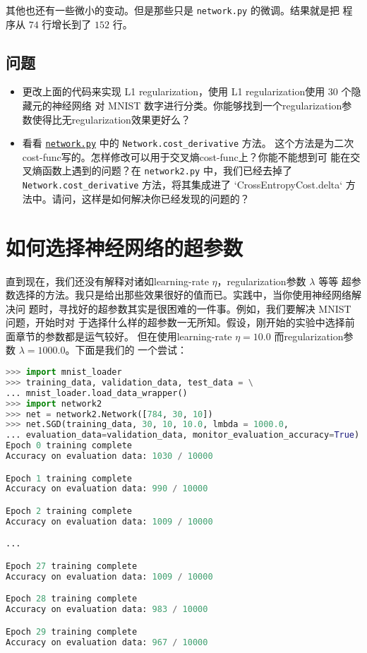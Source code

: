 其他也还有一些微小的变动。但是那些只是 \lstinline!network.py! 的微调。结果就是把
程序从 $74$ 行增长到了 $152$ 行。

\subsection*{问题}

\begin{itemize}
\item 更改上面的代码来实现 L1 \gls*{regularization}，使用 L1 \gls*{regularization}使用 $30$ 个隐藏元的神经网络
  对 MNIST 数字进行分类。你能够找到一个\gls*{regularization}参数使得比无\gls*{regularization}效果更好么？
\item 看看 \href{https://github.com/mnielsen/neural-networks-and-deep-learning/blob/master/src/network.py}{\lstinline!network.py!} 中的 \lstinline!Network.cost_derivative! 方法。
  这个方法是为二次\gls*{cost-func}写的。怎样修改可以用于交叉熵\gls*{cost-func}上？你能不能想到可
  能在交叉熵函数上遇到的问题？在 \lstinline!network2.py! 中，我们已经去掉了
  \lstinline!Network.cost_derivative! 方法，将其集成进了
  `CrossEntropyCost.delta` 方法中。请问，这样是如何解决你已经发现的问题的？
\end{itemize}

\section{如何选择神经网络的超参数}
\label{sec:how_to_choose_a_neural_network's_hyper-parameters}

直到现在，我们还没有解释对诸如\gls*{learning-rate} $\eta$，\gls*{regularization}参数 $\lambda$ 等等
超参数选择的方法。我只是给出那些效果很好的值而已。实践中，当你使用神经网络解决问
题时，寻找好的超参数其实是很困难的一件事。例如，我们要解决 MNIST 问题，开始时对
于选择什么样的超参数一无所知。假设，刚开始的实验中选择前面章节的参数都是运气较好。
但在使用\gls*{learning-rate} $\eta=10.0$ 而\gls*{regularization}参数 $\lambda=1000.0$。下面是我们的
一个尝试：

\begin{lstlisting}[language=Python]
>>> import mnist_loader
>>> training_data, validation_data, test_data = \
... mnist_loader.load_data_wrapper()
>>> import network2
>>> net = network2.Network([784, 30, 10])
>>> net.SGD(training_data, 30, 10, 10.0, lmbda = 1000.0,
... evaluation_data=validation_data, monitor_evaluation_accuracy=True)
Epoch 0 training complete
Accuracy on evaluation data: 1030 / 10000

Epoch 1 training complete
Accuracy on evaluation data: 990 / 10000

Epoch 2 training complete
Accuracy on evaluation data: 1009 / 10000

...

Epoch 27 training complete
Accuracy on evaluation data: 1009 / 10000

Epoch 28 training complete
Accuracy on evaluation data: 983 / 10000

Epoch 29 training complete
Accuracy on evaluation data: 967 / 10000
\end{lstlisting}

